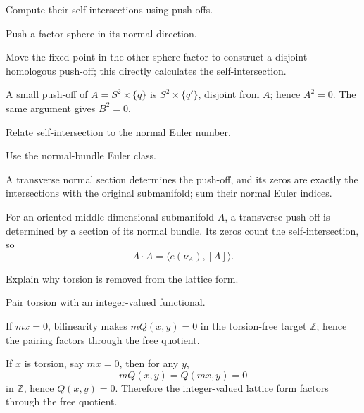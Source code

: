 \begin{exercise}\label{exr:viii34-19}
Compute their self-intersections using push-offs.
\end{exercise}
\begin{hint}
Push a factor sphere in its normal direction.

Move the fixed point in the other sphere factor to construct a disjoint homologous push-off; this directly calculates the self-intersection.
\end{hint}
\begin{solution}
A small push-off of \(A=S^2\times\{q\}\) is \(S^2\times\{q'\}\), disjoint from \(A\); hence \(A^2=0\). The same argument gives \(B^2=0\).
\end{solution}

\begin{exercise}\label{exr:viii34-20}
Relate self-intersection to the normal Euler number.
\end{exercise}
\begin{hint}
Use the normal-bundle Euler class.

A transverse normal section determines the push-off, and its zeros are exactly the intersections with the original submanifold; sum their normal Euler indices.
\end{hint}
\begin{solution}
For an oriented middle-dimensional submanifold \(A\), a transverse push-off is determined by a section of its normal bundle. Its zeros count the self-intersection, so
\[
A\cdot A=\langle e(\nu_A),[A]\rangle.
\]
\end{solution}

\begin{exercise}\label{exr:viii34-21}
Explain why torsion is removed from the lattice form.
\end{exercise}
\begin{hint}
Pair torsion with an integer-valued functional.

If \(mx=0\), bilinearity makes \(mQ(x,y)=0\) in the torsion-free target \(\mathbb Z\); hence the pairing factors through the free quotient.
\end{hint}
\begin{solution}
If \(x\) is torsion, say \(mx=0\), then for any \(y\),
\[
mQ(x,y)=Q(mx,y)=0
\]
in \(\mathbb Z\), hence \(Q(x,y)=0\). Therefore the integer-valued lattice form factors through the free quotient.
\end{solution}

